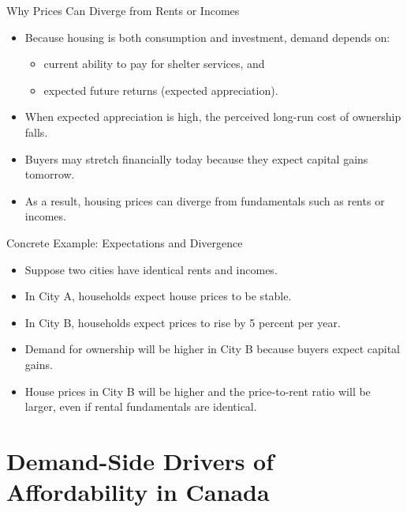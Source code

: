 \documentclass[aspectratio=169]{beamer}
\begin{document}
\begin{frame}{Why Prices Can Diverge from Rents or Incomes}
\transfade
\begin{itemize}
  \item Because housing is both consumption and investment, demand depends on:
  \begin{itemize}
    \item current ability to pay for shelter services, and
    \item expected future returns (expected appreciation).
  \end{itemize}
  \item When expected appreciation is high, the perceived long-run cost of ownership falls.
  \item Buyers may stretch financially today because they expect capital gains tomorrow.
  \item As a result, housing prices can diverge from fundamentals such as rents or incomes.
\end{itemize}
\end{frame}


\begin{frame}{Concrete Example: Expectations and Divergence}
\transfade
\begin{itemize}
  \item Suppose two cities have identical rents and incomes.
  \item In City A, households expect house prices to be stable.
  \item In City B, households expect prices to rise by 5 percent per year.
  \item Demand for ownership will be higher in City B because buyers expect capital gains.
  \item House prices in City B will be higher and the price-to-rent ratio will be larger, even if rental fundamentals are identical.
\end{itemize}
\end{frame}

\section{Demand-Side Drivers of Affordability in Canada}
\end{document}

